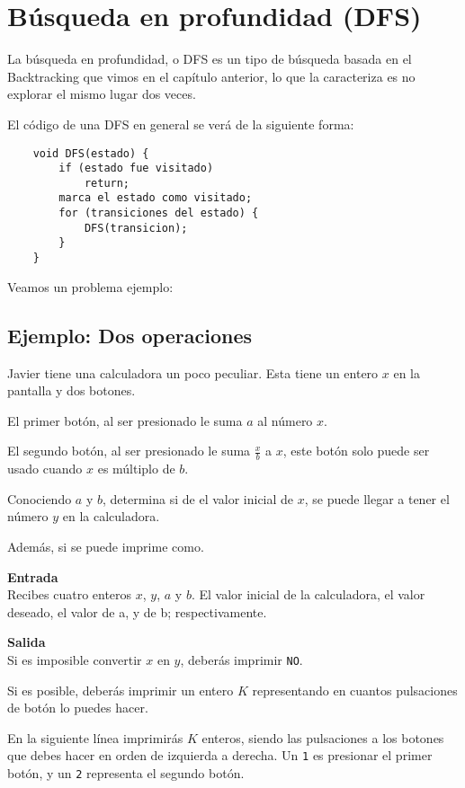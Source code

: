 \chapter{Búsqueda en profundidad (DFS)}
La búsqueda en profundidad, o DFS es un tipo de búsqueda basada en el Backtracking que vimos en el capítulo anterior, lo que la caracteriza es no explorar el mismo lugar dos veces.

El código de una DFS en general se verá de la siguiente forma:

\begin{lstlisting}
	void DFS(estado) {		
		if (estado fue visitado)
			return;
		marca el estado como visitado;
		for (transiciones del estado) {
			DFS(transicion);
		}
	}
\end{lstlisting}

Veamos un problema ejemplo:

\section{Ejemplo: Dos operaciones}
Javier tiene una calculadora un poco peculiar. Esta tiene un entero \(x\) en la pantalla y dos botones.
\begin{plimits}
	\item El primer botón, al ser presionado le suma \(a\) al número \(x\).
	\item El segundo botón, al ser presionado le suma \(\frac{x}{b}\) a \(x\),  este botón solo puede ser usado cuando \(x\) es múltiplo de \(b\).		
\end{plimits}

Conociendo \(a\) y \(b\), determina si de el valor inicial de \(x\), se puede llegar a tener el número \(y\) en la calculadora.

Además, si se puede imprime como.

\textbf{Entrada}\\
Recibes cuatro enteros \(x\), \(y\), \(a\) y \(b\). El valor inicial de la calculadora, el valor deseado, el valor de a, y de b; respectivamente.

\textbf{Salida}\\
Si es imposible convertir \(x\) en \(y\), deberás imprimir \verb|NO|.

Si es posible, deberás imprimir un entero \(K\) representando en cuantos pulsaciones de botón lo puedes hacer.

En la siguiente línea imprimirás \(K\) enteros, siendo las pulsaciones a los botones que debes hacer en orden de izquierda a derecha. Un \verb|1| es presionar el primer botón, y un \verb|2| representa el segundo botón.

